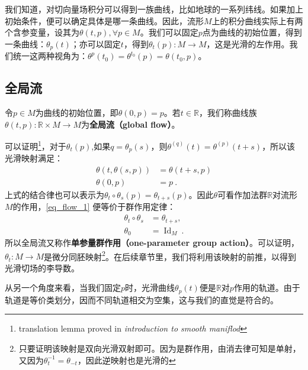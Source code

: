 
\begin{issues}
\issueMissDepend
\end{issues}

我们知道，对切向量场积分可以得到一族曲线，比如地球的一系列纬线。如果加上初始条件，便可以确定具体是哪一条曲线。因此，流形$M$上的积分曲线实际上有两个含参变量，设其为$\theta(t,p),\forall p\in M$。我们可以固定$p$点为曲线的初始位置，得到一条曲线：$\theta_p(t)$；亦可以固定$t$，得到$\theta_t(p):M\rightarrow M$，这是光滑的左作用。我们统一这两种视角为：$\theta^p(t_0)=\theta^{t_0}(p)=\theta(t_0,p)$。
\subsection{全局流}
令$p\in M$为曲线的初始位置，即$\theta(0,p)=p$。若$t\in\mathbb R$，我们称曲线族$\theta(t,p):\mathbb R\times M\rightarrow M$为\textbf{全局流（global flow）}。

可以证明\footnote{translation lemma proved in \textsl{introduction to smooth maniflod}}，对于$\theta_t(p)$,如果$q=\theta_p(s)$，则$\theta^{(q)}(t)=\theta^{(p)}(t+s)$，所以该光滑映射满足：
\begin{equation}\label{eq_flow_1}
\begin{aligned}
\theta(t, \theta(s, p)) & =\theta(t+s, p) \\
\theta(0, p) & =p~.
\end{aligned}
\end{equation}
上式的结合律也可以表示为$\theta_t \circ \theta_s(p)=\theta_{t+s}(p)$。因此$\theta$可看作加法群$\mathbb R$对流形$M$的作用，\autoref{eq_flow_1} 便等价于群作用定律：
\begin{equation}
\begin{aligned}
\theta_t \circ \theta_s & =\theta_{t+s}, \\
\theta_0 & =\operatorname{Id}_M~.
\end{aligned}
\end{equation}
所以全局流又称作\textbf{单参量群作用（one-parameter group action）}。可以证明，$\theta_t:M\rightarrow M$是微分同胚映射\footnote{只要证明该映射是双向光滑双射即可。因为是群作用，由消去律可知是单射，又因为$\theta^{-1}_t=\theta_{-t}$，因此逆映射也是光滑的}。在后续章节里，我们将利用该映射的前推，以得到光滑切场的李导数。


从另一个角度来看，当我们固定$p$时，光滑曲线$\theta_p(t)$便是$\mathbb R$对$p$作用的轨道。由于轨道是等价类划分，因而不同轨道相交为空集，这与我们的直觉是符合的。


